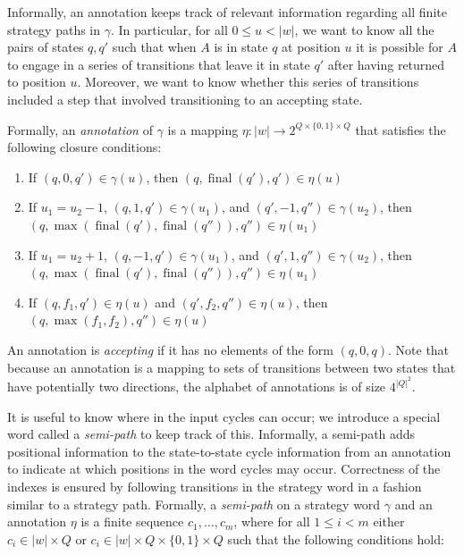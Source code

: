 \documentclass[10pt,a4paper]{amsart}
\theoremstyle{plain}
\theoremstyle{definition}
\theoremstyle{definition}
\DeclareMathOperator{\?}{?}
\DeclareMathOperator{\final}{final}
\begin{document}
Informally, an annotation keeps track of relevant information regarding all finite strategy paths in $\gamma$. In particular,
for all $0 \leq u < |w|$, we want to know all the pairs of states $q,q'$ such that when $A$ is in state $q$ at
position $u$ it is possible for $A$ to engage in a series of transitions that leave it in state $q'$
after having returned to position $u$. Moreover, we want to know whether this series of transitions included a
step that involved transitioning to an accepting state.

Formally, an \textit{annotation}
of $\gamma$ is a mapping $\eta : |w| \rightarrow 2^{Q \times \{ 0,1 \} \times Q}$ that satisfies the
following closure conditions:

\begin{enumerate}
    \item If $(q,0,q') \in \gamma(u)$, then $(q,\final(q'),q') \in \eta(u)$

    \item If $u_1 = u_2 - 1$, $(q,1,q') \in \gamma(u_1)$, and $(q',-1,q'') \in \gamma(u_2)$, then $(q,\max(\final(q'),\final(q'')),\allowbreak q'') \in \eta(u_1)$

    \item If $u_1 = u_2 + 1$, $(q,-1,q') \in \gamma(u_1)$, and $(q',1,q'') \in \gamma(u_2)$, then $(q,\max(\final(q'),\final(q'')),\allowbreak q'') \in \eta(u_1)$

    \item If $(q, f_1, q') \in \eta(u)$ and $(q', f_2, q'') \in \eta(u)$, then $(q, \max(f_1,f_2),q'') \in \eta(u)$
\end{enumerate}
An annotation is \textit{accepting} if it has no elements of the form $(q,0,q)$. Note that because an annotation is a mapping to sets of transitions between two states that have potentially two directions, the alphabet of annotations is of size $4^{|Q|^2}$.

It is useful to know where in the input cycles can occur; we introduce a special word called a \emph{semi-path} to keep track of this. Informally, a semi-path adds positional information to the state-to-state cycle information from an annotation to indicate at which positions in the word cycles may occur. Correctness of the indexes is ensured by following transitions in the strategy word in a fashion similar to a strategy path. Formally, a \textit{semi-path} on a strategy word $\gamma$ and an annotation $\eta$ is a finite sequence $c_1,\ldots,c_m$, where for all $1 \leq i < m$ either $c_i \in |w| \times Q$ or $c_i \in |w| \times Q \times \{0,1\} \times Q$ such that the following conditions hold:
\end{document}
